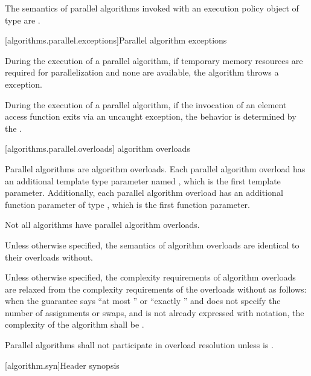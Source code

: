 \pnum
The semantics of parallel algorithms invoked with an execution policy object of
 type
are .

[algorithms.parallel.exceptions]{Parallel algorithm exceptions}

\pnum
During the execution of a parallel algorithm,
if temporary memory resources are required for parallelization
and none are available, the algorithm throws a  exception.

\pnum
During the execution of a parallel algorithm,
if the invocation of an element access function exits via an uncaught exception,
the behavior is determined by the .

[algorithms.parallel.overloads]{ algorithm overloads}

\pnum
Parallel algorithms are algorithm overloads.
Each parallel algorithm overload
has an additional template type parameter named ,
which is the first template parameter.
Additionally, each parallel algorithm overload
has an additional function parameter of type ,
which is the first function parameter.
\begin{note}
Not all algorithms have parallel algorithm overloads.
\end{note}

\pnum
Unless otherwise specified,
the semantics of  algorithm overloads
are identical to their overloads without.

\pnum
Unless otherwise specified,
the complexity requirements of  algorithm overloads
are relaxed from the complexity requirements of the overloads without
as follows:
when the guarantee says ``at most '' or
``exactly ''
and does not specify the number of assignments or swaps, and
 is not already expressed with \bigoh{} notation,
the complexity of the algorithm shall be .

\pnum
Parallel algorithms shall not participate in overload resolution unless
 is .

[algorithm.syn]{Header  synopsis}
%

